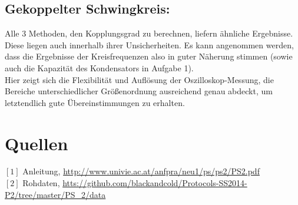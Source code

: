 \documentclass[12pt,a4paper]{article}
\begin{document}
\begin{multicols}{2}
\subsection{Gekoppelter Schwingkreis:}
Alle 3 Methoden, den Kopplungsgrad zu berechnen, liefern ähnliche Ergebnisse. Diese liegen auch innerhalb ihrer Unsicherheiten. Es kann angenommen werden, dass die Ergebnisse der Kreisfrequenzen also in guter Näherung stimmen (sowie auch die Kapazität des Kondensators in Aufgabe 1).\\
Hier zeigt sich die Flexibilität und Auflösung der Oszilloskop-Messung, die Bereiche unterschiedlicher Größenordnung ausreichend genau abdeckt, um letztendlich gute Übereinstimmungen zu erhalten.\\




\section{Quellen}
$[1]$ Anleitung, \url{http://www.univie.ac.at/anfpra/neu1/ps/ps2/PS2.pdf}\\
$[2]$ Rohdaten, \url{htts://github.com/blackandcold/Protocols-SS2014-P2/tree/master/PS_2/data}\\

\end{multicols}
\end{document}
